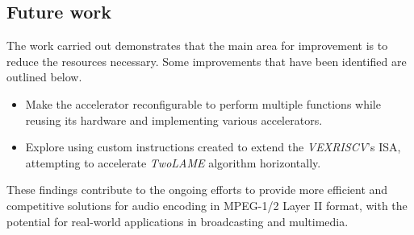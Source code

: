 \subsection{Future work}

The work carried out demonstrates that the main area for improvement is to reduce the resources necessary. Some improvements that have been identified are outlined below.

\begin{itemize} 

\item Make the accelerator reconfigurable to perform multiple functions while reusing its hardware and implementing various accelerators.

\item Explore using custom instructions created to extend the  \textit{VEXRISCV}’s ISA, attempting to accelerate \textit{TwoLAME} algorithm horizontally. \\

\end{itemize} 

These findings contribute to the ongoing efforts to provide more efficient and competitive solutions for audio encoding in MPEG-1/2 Layer II format, with the potential for real-world applications in broadcasting and multimedia.



